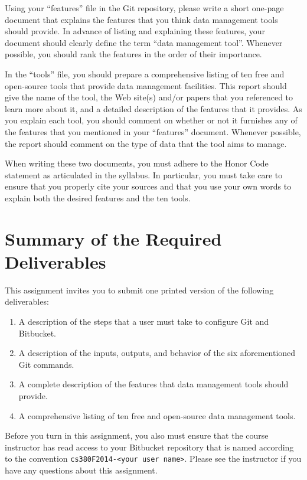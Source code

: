 Using your ``features'' file in the Git repository, please write a short one-page document that explains the features
that you think data management tools should provide.  In advance of listing and explaining these features, your
document should clearly define the term ``data management tool''. Whenever possible, you should rank the features in the
order of their importance.

In the ``tools'' file, you should prepare a comprehensive listing of ten free and open-source tools that provide data
management facilities.  This report should give the name of the tool, the Web site(s) and/or papers that you referenced
to learn more about it, and a detailed description of the features that it provides.  As you explain each tool, you
should comment on whether or not it furnishes any of the features that you mentioned in your ``features'' document.
Whenever possible, the report should comment on the type of data that the tool aims to manage. 

When writing these two documents, you must adhere to the Honor Code statement as articulated in the syllabus.  In
particular, you must take care to ensure that you properly cite your sources and that you use your own words to explain
both the desired features and the ten tools. 

\section*{Summary of the Required Deliverables}

  This assignment invites you to submit one printed version of the following deliverables:

  \vspace*{-.05in}
  \begin{enumerate}
    \setlength{\itemsep}{0pt}
    \item A description of the steps that a user must take to configure Git and Bitbucket.
    \item A description of the inputs, outputs, and behavior of the six aforementioned Git commands.
    \item A complete description of the features that data management tools should provide.
    \item A comprehensive listing of ten free and open-source data management tools.
  \end{enumerate}

\vspace*{-.1in} 

Before you turn in this assignment, you also must ensure that the course instructor has read access to your Bitbucket
repository that is named according to the convention {\tt cs380F2014-<your user name>}.  Please see the instructor if
you have any questions about this assignment. 





